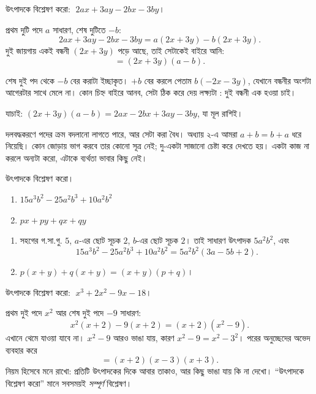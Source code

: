 \documentclass[11pt]{article}
\begin{document}
\begin{example}
উৎপাদকে বিশ্লেষণ করো: $\;2ax + 3ay - 2bx - 3by$।
\end{example}

\begin{solbox}
প্রথম দুটি পদে $a$ সাধারণ, শেষ দুটিতে $-b$:
\[
  2ax + 3ay - 2bx - 3by = a(2x + 3y) - b(2x + 3y).
\]
দুই জায়গায় একই বন্ধনী $(2x+3y)$ পড়ে আছে, তাই সেটাকেই বাইরে আনি:
\[
  = (2x + 3y)(a - b).
\]

শেষ দুই পদ থেকে $-b$ বের করাটা ইচ্ছাকৃত। $+b$ বের করলে পেতাম $b(-2x - 3y)$,
যেখানে বন্ধনীর অংশটা আগেরটার সাথে মেলে না। কোন চিহ্ন বাইরে আনব, সেটা ঠিক করে দেয়
লক্ষ্যটা : দুই বন্ধনী এক হওয়া চাই।

যাচাই: $(2x+3y)(a-b) = 2ax - 2bx + 3ay - 3by$, যা মূল রাশিই।
\end{solbox}

\begin{remark}
দলবদ্ধকরণে পদের ক্রম বদলানো লাগতে পারে, আর সেটা করা বৈধ। অধ্যায় ২-এ
আমরা $a + b = b + a$ ধরে নিয়েছি। কোন জোড়ায় ভাগ করবে তার কোনো সূত্র নেই; দু-একটা
সাজানো চেষ্টা করে দেখতে হয়। একটা কাজ না করলে অন্যটা করো, এটাকে ব্যর্থতা ভাবার
কিছু নেই।
\end{remark}

 উৎপাদকে বিশ্লেষণ করো।
\begin{enumerate}
  \item $15a^{3}b^{2} - 25a^{2}b^{3} + 10a^{2}b^{2}$
  \item $px + py + qx + qy$
\end{enumerate}

\begin{sol}
\begin{enumerate}
  \item সহগের গ.সা.গু. $5$, $a$-এর ছোট সূচক $2$, $b$-এর ছোট সূচক $2$। তাই সাধারণ
        উৎপাদক $5a^{2}b^{2}$, এবং
        \[
          15a^{3}b^{2} - 25a^{2}b^{3} + 10a^{2}b^{2} = 5a^{2}b^{2}(3a - 5b + 2).
        \]
  \item $p(x+y) + q(x+y) = (x+y)(p+q)$।
\end{enumerate}
\end{sol}

 উৎপাদকে বিশ্লেষণ করো: $\;x^{3} + 2x^{2} - 9x - 18$।

\begin{sol}
প্রথম দুই পদে $x^{2}$ আর শেষ দুই পদে $-9$ সাধারণ:
\[
  x^{2}(x + 2) - 9(x + 2) = (x + 2)(x^{2} - 9).
\]
এখানে থেমে যাওয়া যাবে না। $x^{2} - 9$ আরও ভাঙা যায়, কারণ $x^2 - 9 = x^2 - 3^2$।
পরের অনুচ্ছেদের অভেদ ব্যবহার করে
\[
  = (x + 2)(x - 3)(x + 3).
\]
নিয়ম হিসেবে মনে রাখো: প্রতিটি উৎপাদকের দিকে আবার তাকাও, আর কিছু ভাঙা যায় কি না
দেখো। ``উৎপাদকে বিশ্লেষণ করো'' মানে সবসময়ই \emph{সম্পূর্ণ} বিশ্লেষণ।
\end{sol}
\end{document}
